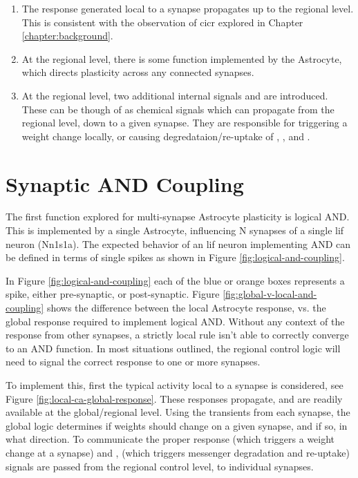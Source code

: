 \begin{enumerate}
\item The \ca response generated local to a synapse propagates up to the
  regional level. This is consistent with the observation of \Gls{cicr} explored in
  Chapter \ref{chapter:background}.
\item At the regional level, there is some function implemented by the
  Astrocyte, which directs plasticity across any connected synapses.
\item At the regional level, two additional internal signals \dser and
  \serca are introduced. These can be though of as chemical signals which can
  propagate from the regional level, down to a given synapse. They are
  responsible for triggering a weight change locally, or causing
  degredataion/re-uptake of \ipt, \kp, and \ca.
\end{enumerate}


\section{Synaptic AND Coupling}
The first function explored for multi-synapse Astrocyte plasticity is logical
AND. This is implemented by a single Astrocyte, influencing N synapses of a
single \Gls{lif} neuron (Nn1s1a). The expected behavior of an \Gls{lif} neuron implementing
AND can be defined in terms of single spikes as shown in Figure
\ref{fig:logical-and-coupling}.


In Figure \ref{fig:logical-and-coupling} each of the blue or orange boxes
represents a spike, either pre-synaptic, or post-synaptic. Figure
\ref{fig:global-v-local-and-coupling} shows the difference between the local
Astrocyte response, vs. the global response required to implement logical
AND. Without any context of the response from other synapses, a strictly local
rule isn't able to correctly converge to an AND function. In most situations
outlined, the regional control logic will need to signal the correct response to
one or more synapses.

To implement this, first the typical activity local to a synapse is considered,
see Figure \ref{fig:local-ca-global-response}. These \ca responses propagate,
and are readily available at the global/regional level. Using the \ca transients
from each synapse, the global logic determines if weights should change on a
given synapse, and if so, in what direction. To communicate the proper response
\dser (which triggers a weight change at a synapse) and \serca, (which triggers
messenger degradation and re-uptake) signals are passed from the regional
control level, to individual synapses.


